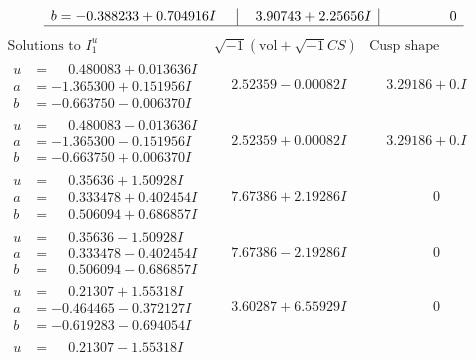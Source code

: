 \documentclass[1p]{elsarticle_modified}
\theoremstyle{definition}
\newcommand{\I}{\sqrt{-1}}
\begin{document}
$$\begin{array}{c|c|c}
\begin{aligned}
b &= -0.388233 + 0.704916 I\end{aligned}
 & \phantom{-}3.90743 + 2.25656 I & \phantom{-0.000000 } 0\\
 \hline 
 \end{array}$$\newpage$$\begin{array}{c|c|c}  
\text{Solutions to }I^u_{1}& \I (\text{vol} + \sqrt{-1}CS) & \text{Cusp shape}\\
 \hline 
\begin{aligned}
u &= \phantom{-}0.480083 + 0.013636 I \\
a &= -1.365300 + 0.151956 I \\
b &= -0.663750 - 0.006370 I\end{aligned}
 & \phantom{-}2.52359 - 0.00082 I & \phantom{-}3.29186 + 0. I\phantom{ +0.000000I} \\ \hline\begin{aligned}
u &= \phantom{-}0.480083 - 0.013636 I \\
a &= -1.365300 - 0.151956 I \\
b &= -0.663750 + 0.006370 I\end{aligned}
 & \phantom{-}2.52359 + 0.00082 I & \phantom{-}3.29186 + 0. I\phantom{ +0.000000I} \\ \hline\begin{aligned}
u &= \phantom{-}0.35636 + 1.50928 I \\
a &= \phantom{-}0.333478 + 0.402454 I \\
b &= \phantom{-}0.506094 + 0.686857 I\end{aligned}
 & \phantom{-}7.67386 + 2.19286 I & \phantom{-0.000000 } 0 \\ \hline\begin{aligned}
u &= \phantom{-}0.35636 - 1.50928 I \\
a &= \phantom{-}0.333478 - 0.402454 I \\
b &= \phantom{-}0.506094 - 0.686857 I\end{aligned}
 & \phantom{-}7.67386 - 2.19286 I & \phantom{-0.000000 } 0 \\ \hline\begin{aligned}
u &= \phantom{-}0.21307 + 1.55318 I \\
a &= -0.464465 - 0.372127 I \\
b &= -0.619283 - 0.694054 I\end{aligned}
 & \phantom{-}3.60287 + 6.55929 I & \phantom{-0.000000 } 0 \\ \hline\begin{aligned}
u &= \phantom{-}0.21307 - 1.55318 I \\

\end{aligned}
\end{array}$$
\end{document}
